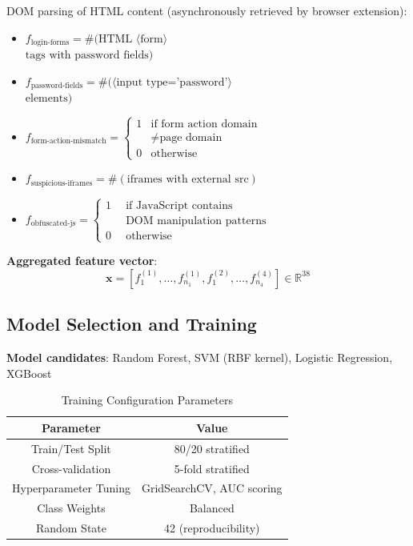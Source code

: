 \documentclass[conference]{IEEEtran}
\begin{document}
DOM parsing of HTML content (asynchronously retrieved by browser extension):
\begin{itemize}
\item $f_{\text{login-forms}} = \#(\text{HTML } \langle\text{form}\rangle$ \\
\quad $\text{tags with password fields})$
\item $f_{\text{password-fields}} = \#(\langle\text{input type='password'}\rangle$ \\
\quad $\text{elements})$
\item $f_{\text{form-action-mismatch}} = \begin{cases} 1 & \text{if form action domain} \\ & \neq \text{page domain} \\ 0 & \text{otherwise} \end{cases}$
\item $f_{\text{suspicious-iframes}} = \#(\text{iframes with external src})$
\item $f_{\text{obfuscated-js}} = \begin{cases} 1 & \text{if JavaScript contains} \\
\quad & \text{DOM manipulation patterns} \\ 0 & \text{otherwise} \end{cases}$
\end{itemize}

\textbf{Aggregated feature vector}: 
\[
\mathbf{x} = [f_1^{(1)}, \ldots, f_{n_1}^{(1)}, f_1^{(2)}, \ldots, f_{n_4}^{(4)}] \in \mathbb{R}^{38}
\]

\subsection{Model Selection and Training}

\textbf{Model candidates}: Random Forest, SVM (RBF kernel), Logistic Regression, XGBoost

\begin{table}[htbp]
\caption{Training Configuration Parameters}
\begin{center}
\begin{tabular}{|c|c|}
\hline
\textbf{Parameter} & \textbf{Value} \\
\hline
Train/Test Split & 80/20 stratified \\
\hline
Cross-validation & 5-fold stratified \\
\hline
Hyperparameter Tuning & GridSearchCV, AUC scoring \\
\hline
Class Weights & Balanced \\
\hline
Random State & 42 (reproducibility) \\
\hline
\end{tabular}
\label{tab:config}
\end{center}
\end{table}
\end{document}
